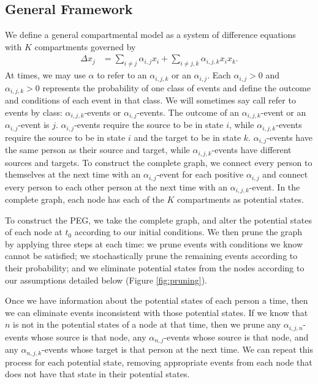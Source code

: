 \documentclass[PTRSB]{rsos}
\begin{document}
\begin{multicols}{2}
\subsection*{General Framework}
We define a general compartmental model as a system of difference equations with $K$ compartments governed by 
\begin{align*}
\Delta x_{j} &= \sum_{i \neq j} \alpha_{i,j}x_i + \sum_{i \neq j, k} \alpha_{i,j,k} x_ix_k.
\end{align*}
At times, we may use $\alpha$ to refer to an $\alpha_{i,j,k}$ or an $\alpha_{i,j}$.
Each $\alpha_{i,j} > 0$ and $\alpha_{i,j,k} > 0$ represents the probability of one class of events and define the outcome and conditions of each event in that class.
We will sometimes say call refer to events by class: $\alpha_{i,j,k}$-events or $\alpha_{i,j}$-events.
The outcome of an $\alpha_{i,j,k}$-event or an $\alpha_{i,j}$-event is $j$.
$\alpha_{i,j}$-events require the source to be in state $i$, while $\alpha_{i,j,k}$-events require the source to be in state $i$ and the target to be in state $k$.
$\alpha_{i,j}$-events have the same person as their source and target, while $\alpha_{i,j,k}$-events have different sources and targets.
To construct the complete graph, we connect every person to themselves at the next time with an $\alpha_{i,j}$-event for each positive $\alpha_{i,j}$ and connect every person to each other person at the next time with an $\alpha_{i,j,k}$-event.
In the complete graph, each node has each of the $K$ compartments as potential states.

To construct the PEG, we take the complete graph, and alter the potential states of each node at $t_0$ according to our initial conditions.
We then prune the graph by applying three steps at each time: we prune events with conditions we know cannot be satisfied; we stochastically prune the remaining events according to their probability; and we eliminate potential states from the nodes according to our assumptions detailed below (Figure \ref{fig:pruning}).

Once we have information about the potential states of each person a time, then we can eliminate events inconsistent with those potential states.
If we know that $n$ is not in the potential states of a node at that time, then we prune any $\alpha_{i,j,n}$-events whose source is that node, any $\alpha_{n,j}$-events whose source is that node, and any $\alpha_{n,j,k}$-events whose target is that person at the next time.
We can repeat this process for each potential state, removing appropriate events from each node that does not have that state in their potential states.%


\end{multicols}
\end{document}
